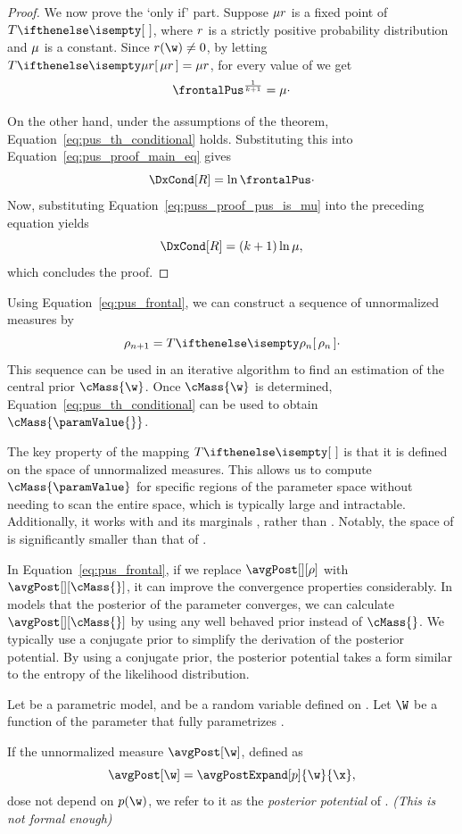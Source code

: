 \begin{proof}
    We now prove the `only if' part.
    Suppose $\mu r$ is a fixed point of $\fpMap{}$, where $r$ is a strictly positive probability
    distribution and $\mu$ is a constant.
    Since $\solPrior(\w) \neq 0$, by letting $\fpMap{\fixedPoint} = \fixedPoint$, for every value of \w we get
    \begin{equation}
        \label{eq:puss_proof_pus_is_mu}
        \frontalPus^{\frac{1}{k+1}} = \normConst \cdot
    \end{equation}

    On the other hand, under the assumptions of the theorem, Equation~\ref{eq:pus_th_conditional} holds.
    Substituting this into Equation~\ref{eq:pus_proof_main_eq} gives
    \[
        \DxCond[\solDist] = \ln \frontalPus \cdot
    \]
    Now, substituting Equation~\ref{eq:puss_proof_pus_is_mu} into the preceding equation yields
    \[
        \DxCond[\solDist] = (k + 1) \ln \normConst,
    \]
    which concludes the proof.
\end{proof}


Using Equation~\ref{eq:pus_frontal}, we can construct a sequence of unnormalized measures by
\[\rho_{n+1} = \fpMap{\rho_n} \cdot \]
This sequence can be used in an iterative algorithm to find an estimation of the central prior $\cMass{\w}$.
Once $\cMass{\w}$ is determined, Equation~\ref{eq:pus_th_conditional} can be used to obtain $\cMass{\paramValue{}}$.

The key property of the mapping $\fpMap{}$ is that it is defined on the space of unnormalized measures.
This allows us to compute $\cMass{\paramValue}$ for
specific regions of the parameter space without needing to scan the entire space, which is typically large and intractable.
Additionally, it works with \w and its marginals \w[i], rather than \paramValue.
Notably, the space of \w is significantly smaller than that of \paramValue.

In Equation~\ref{eq:pus_frontal}, if we replace $\avgPost[][\rho]$ with $\avgPost[][\cMass{}]$, it can improve the
convergence properties considerably.
In models that the posterior of the parameter converges, we can calculate $\avgPost[][\cMass{}]$ by using any well
behaved prior instead of $\cMass{}$.
We typically use a conjugate prior to simplify the derivation of the posterior potential.
By using a conjugate prior, the posterior potential takes a form similar to the entropy of the likelihood distribution.


\begin{definition}
    Let \pmodel be a parametric model, and \X be a random variable defined on .
    Let $\W$ be a function of the parameter \param that fully parametrizes \X.

    If the unnormalized measure $\avgPost[\w]$, defined as
    \begin{equation*}
        \avgPost[\w] = \avgPostExpand[p]{\w}{\x},
    \end{equation*}
    dose not depend on $p(\w)$, we refer to it as the \emph{posterior potential} of \w.
    \emph{(This is not formal enough)}
\end{definition}

